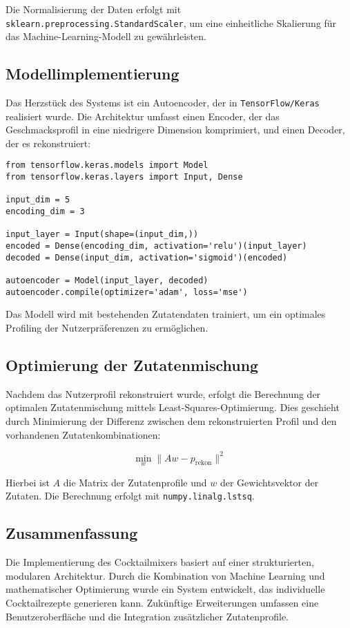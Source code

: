 \documentclass[a4paper,12pt]{article}
\begin{document}
Die Normalisierung der Daten erfolgt mit \texttt{sklearn.preprocessing.StandardScaler}, um eine einheitliche Skalierung für das Machine-Learning-Modell zu gewährleisten.

\subsection{Modellimplementierung}
Das Herzstück des Systems ist ein Autoencoder, der in \texttt{TensorFlow/Keras} realisiert wurde. Die Architektur umfasst einen Encoder, der das Geschmacksprofil in eine niedrigere Dimension komprimiert, und einen Decoder, der es rekonstruiert:

\begin{verbatim}
from tensorflow.keras.models import Model
from tensorflow.keras.layers import Input, Dense

input_dim = 5
encoding_dim = 3

input_layer = Input(shape=(input_dim,))
encoded = Dense(encoding_dim, activation='relu')(input_layer)
decoded = Dense(input_dim, activation='sigmoid')(encoded)

autoencoder = Model(input_layer, decoded)
autoencoder.compile(optimizer='adam', loss='mse')
\end{verbatim}

Das Modell wird mit bestehenden Zutatendaten trainiert, um ein optimales Profiling der Nutzerpräferenzen zu ermöglichen.

\subsection{Optimierung der Zutatenmischung}
Nachdem das Nutzerprofil rekonstruiert wurde, erfolgt die Berechnung der optimalen Zutatenmischung mittels Least-Squares-Optimierung. Dies geschieht durch Minimierung der Differenz zwischen dem rekonstruierten Profil und den vorhandenen Zutatenkombinationen:

\begin{equation}
\min_{w} \| A w - p_{\text{rekon}} \|^2
\end{equation}

Hierbei ist \( A \) die Matrix der Zutatenprofile und \( w \) der Gewichtsvektor der Zutaten. Die Berechnung erfolgt mit \texttt{numpy.linalg.lstsq}.

\subsection{Zusammenfassung}
Die Implementierung des Cocktailmixers basiert auf einer strukturierten, modularen Architektur. Durch die Kombination von Machine Learning und mathematischer Optimierung wurde ein System entwickelt, das individuelle Cocktailrezepte generieren kann. Zukünftige Erweiterungen umfassen eine Benutzeroberfläche und die Integration zusätzlicher Zutatenprofile.
\end{document}

